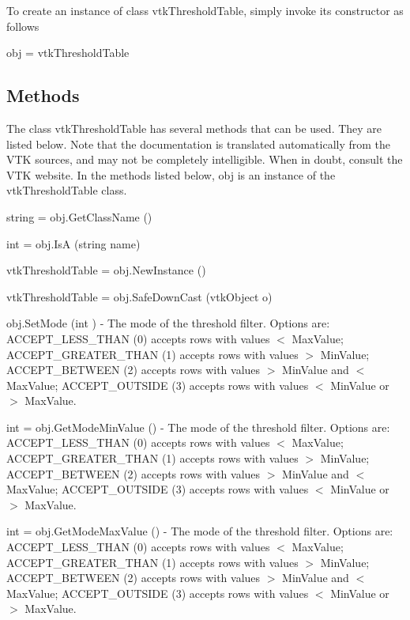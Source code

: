 To create an instance of class vtk\-Threshold\-Table, simply invoke its constructor as follows \begin{DoxyVerb}  obj = vtkThresholdTable
\end{DoxyVerb}
 \hypertarget{vtkwidgets_vtkxyplotwidget_Methods}{}\subsection{Methods}\label{vtkwidgets_vtkxyplotwidget_Methods}
The class vtk\-Threshold\-Table has several methods that can be used. They are listed below. Note that the documentation is translated automatically from the V\-T\-K sources, and may not be completely intelligible. When in doubt, consult the V\-T\-K website. In the methods listed below, {\ttfamily obj} is an instance of the vtk\-Threshold\-Table class. 
\begin{DoxyItemize}
\item {\ttfamily string = obj.\-Get\-Class\-Name ()}  
\item {\ttfamily int = obj.\-Is\-A (string name)}  
\item {\ttfamily vtk\-Threshold\-Table = obj.\-New\-Instance ()}  
\item {\ttfamily vtk\-Threshold\-Table = obj.\-Safe\-Down\-Cast (vtk\-Object o)}  
\item {\ttfamily obj.\-Set\-Mode (int )} -\/ The mode of the threshold filter. Options are\-: A\-C\-C\-E\-P\-T\-\_\-\-L\-E\-S\-S\-\_\-\-T\-H\-A\-N (0) accepts rows with values $<$ Max\-Value; A\-C\-C\-E\-P\-T\-\_\-\-G\-R\-E\-A\-T\-E\-R\-\_\-\-T\-H\-A\-N (1) accepts rows with values $>$ Min\-Value; A\-C\-C\-E\-P\-T\-\_\-\-B\-E\-T\-W\-E\-E\-N (2) accepts rows with values $>$ Min\-Value and $<$ Max\-Value; A\-C\-C\-E\-P\-T\-\_\-\-O\-U\-T\-S\-I\-D\-E (3) accepts rows with values $<$ Min\-Value or $>$ Max\-Value.  
\item {\ttfamily int = obj.\-Get\-Mode\-Min\-Value ()} -\/ The mode of the threshold filter. Options are\-: A\-C\-C\-E\-P\-T\-\_\-\-L\-E\-S\-S\-\_\-\-T\-H\-A\-N (0) accepts rows with values $<$ Max\-Value; A\-C\-C\-E\-P\-T\-\_\-\-G\-R\-E\-A\-T\-E\-R\-\_\-\-T\-H\-A\-N (1) accepts rows with values $>$ Min\-Value; A\-C\-C\-E\-P\-T\-\_\-\-B\-E\-T\-W\-E\-E\-N (2) accepts rows with values $>$ Min\-Value and $<$ Max\-Value; A\-C\-C\-E\-P\-T\-\_\-\-O\-U\-T\-S\-I\-D\-E (3) accepts rows with values $<$ Min\-Value or $>$ Max\-Value.  
\item {\ttfamily int = obj.\-Get\-Mode\-Max\-Value ()} -\/ The mode of the threshold filter. Options are\-: A\-C\-C\-E\-P\-T\-\_\-\-L\-E\-S\-S\-\_\-\-T\-H\-A\-N (0) accepts rows with values $<$ Max\-Value; A\-C\-C\-E\-P\-T\-\_\-\-G\-R\-E\-A\-T\-E\-R\-\_\-\-T\-H\-A\-N (1) accepts rows with values $>$ Min\-Value; A\-C\-C\-E\-P\-T\-\_\-\-B\-E\-T\-W\-E\-E\-N (2) accepts rows with values $>$ Min\-Value and $<$ Max\-Value; A\-C\-C\-E\-P\-T\-\_\-\-O\-U\-T\-S\-I\-D\-E (3) accepts rows with values $<$ Min\-Value or $>$ Max\-Value.  

\end{DoxyItemize}
